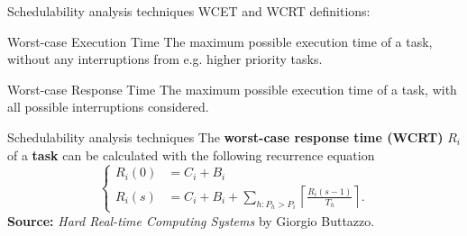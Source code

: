 \begin{frame}{Schedulability analysis techniques}
    WCET and WCRT definitions:
    \vspace{1em}

    \begin{block}{Worst-case Execution Time}
        The maximum possible execution time of a task, without any
        interruptions from e.g. higher priority tasks.
    \end{block}

    \vspace{1em}

    \begin{block}{Worst-case Response Time}
        The maximum possible execution time of a task, with all
        possible interruptions considered.
    \end{block}
\end{frame}

\begin{frame}{Schedulability analysis techniques}
    The \textbf{worst-case response time (WCRT)} $R_i$ of a \textbf{task} can be calculated with
    the following recurrence equation
    \begin{equation}
        \begin{cases}
            R_{i}(0) &= C_i + B_i \\
            R_{i}(s) &= C_i + B_i + \sum\limits_{h: P_h > P_i} \left\lceil \frac{R_{i}(s-1)}{T_h} \right\rceil.
        \end{cases}
    \end{equation}
    \textbf{Source:} \emph{Hard Real-time Computing Systems} by Giorgio Buttazzo.
\end{frame}

